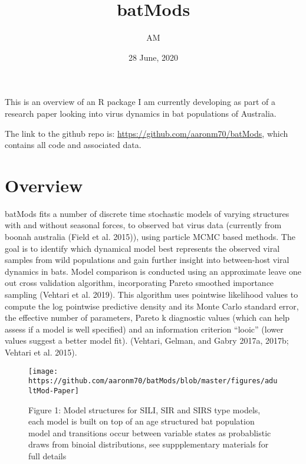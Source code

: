 \documentclass[
]{article}
\title{batMods}
\author{AM}
\date{28 June, 2020}
\begin{document}
\maketitle

This is an overview of an R package I am currently developing as part of
a research paper looking into virus dynamics in bat populations of
Australia.

The link to the github repo is:
\url{https://github.com/aaronm70/batMods}, which contains all code and
associated data.

\hypertarget{overview}{%
\section{Overview}\label{overview}}

batMods fits a number of discrete time stochastic models of varying
structures with and without seasonal forces, to observed bat virus data
(currently from boonah australia (Field et al. 2015)), using particle
MCMC based methods. The goal is to identify which dynamical model best
represents the observed viral samples from wild populations and gain
further insight into between-host viral dynamics in bats. Model
comparison is conducted using an approximate leave one out cross
validation algorithm, incorporating Pareto smoothed importance sampling
(Vehtari et al. 2019). This algorithm uses pointwise likelihood values
to compute the log pointwise predictive density and its Monte Carlo
standard error, the effective number of parameters, Pareto k diagnostic
values (which can help assess if a model is well specified) and an
information criterion ``looic'' (lower values suggest a better model
fit). (Vehtari, Gelman, and Gabry 2017a, 2017b; Vehtari et al. 2015).

\begin{figure}
\texttt{[image: https://github.com/aaronm70/batMods/blob/master/figures/adultMod-Paper]} \caption{Figure 1: Model structures for SILI, SIR and SIRS type models, each model is built on top of an age structured bat population model and transitions occur between variable states as probablistic draws from binoial distributions, see suppplementary materials for full details}\label{fig:unnamed-chunk-1}
\end{figure}
\end{document}
